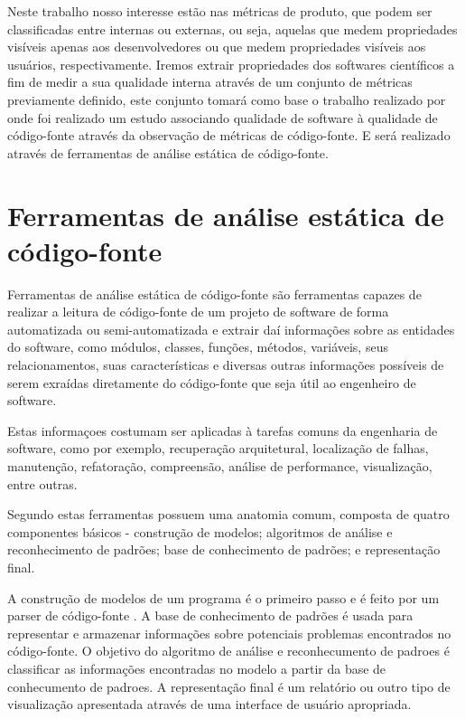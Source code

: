\documentclass[qual, classic, a4paper]{ufbathesis}
\begin{document}
Neste trabalho nosso interesse estão nas métricas de produto, que podem ser
classificadas entre internas ou externas, ou seja, aquelas que medem
propriedades visíveis apenas aos desenvolvedores ou que medem propriedades
visíveis aos usuários, respectivamente. Iremos extrair propriedades dos
softwares científicos a fim de medir a sua qualidade interna através de um
conjunto de métricas previamente definido, este conjunto tomará como base o
trabalho realizado por  onde foi realizado um estudo
associando qualidade de software à qualidade de código-fonte através da
observação de métricas de código-fonte. E será realizado através de
ferramentas de análise estática de código-fonte.

\section{Ferramentas de análise estática de código-fonte}

Ferramentas de análise estática de código-fonte são ferramentas capazes de
realizar a leitura de código-fonte de um projeto de software de forma
automatizada ou semi-automatizada e extrair daí informações sobre as entidades
do software, como módulos, classes, funções, métodos, variáveis, seus
relacionamentos, suas características e diversas outras informações possíveis
de serem exraídas diretamente do código-fonte que seja útil ao engenheiro de
software.

Estas informaçoes costumam ser aplicadas à tarefas comuns da engenharia de
software, como por exemplo, recuperação arquitetural, localização de falhas,
manutenção, refatoração, compreensão, análise de performance, visualização,
entre outras.

Segundo  estas ferramentas possuem uma
anatomia comum, composta de quatro componentes básicos - construção de
modelos; algoritmos de análise e reconhecimento de padrões; base de
conhecimento de padrões; e representação final.

A construção de modelos de um programa é o primeiro passo e é feito por um
parser de código-fonte \cite{Binkley2007}. A base de conhecimento de padrões é
usada para representar e armazenar informações sobre potenciais problemas
encontrados no código-fonte. O objetivo do algoritmo de análise e
reconhecumento de padroes é classificar as informações encontradas no modelo a
partir da base de conhecumento de padroes. A representação final é um
relatório ou outro tipo de visualização apresentada através de uma interface
de usuário apropriada.
\end{document}
